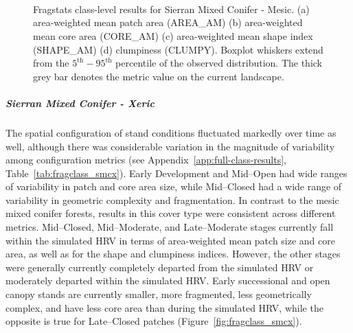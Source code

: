 \begin{figure}[!htbp]
  \centering
   \\
   \\
   \\
\caption{Fragstats class-level results for Sierran Mixed Conifer - Mesic. (a) area-weighted mean patch area (AREA\_AM) (b) area-weighted mean core area (CORE\_AM) (c) area-weighted mean shape index (SHAPE\_AM) (d) clumpiness (CLUMPY). Boxplot whiskers extend from the $5^{\text{th}}-95^{\text{th}}$ percentile of the observed distribution. The thick grey bar denotes the metric value on the current landscape.}
\label{fig:fragclass_smcm}
\end{figure}




\subparagraph*{Sierran Mixed Conifer - Xeric}
The spatial configuration of stand conditions fluctuated markedly over time as well, although there was considerable variation in the magnitude of variability among configuration metrics (see Appendix~\ref{app:full-class-results}, Table~\ref{tab:fragclass_smcx}). Early Development and Mid--Open had wide ranges of variability in patch and core area size, while Mid--Closed had a wide range of variability in geometric complexity and fragmentation. In contrast to the mesic mixed conifer forests, results in this cover type were consistent across different metrics. Mid--Closed, Mid--Moderate, and Late--Moderate stages currently fall within the simulated HRV in terms of area-weighted mean patch size and core area, as well as for the shape and clumpiness indices. However, the other stages were generally currently completely departed from the simulated HRV or moderately departed within the simulated HRV. Early successional and open canopy stands are currently smaller, more fragmented, less geometrically complex, and have less core area than during the simulated HRV, while the opposite is true for Late--Closed patches (Figure~\ref{fig:fragclass_smcx}).

